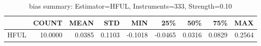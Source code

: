 \begin{table}[ht]
\centering
\caption{bias summary: Estimator=HFUL, Instruments=333, Strength=0.10}
\begin{tabular}{lrrrrrrrr}
\toprule
 & COUNT & MEAN & STD & MIN & 25\% & 50\% & 75\% & MAX \\
\midrule
HFUL & 10.0000 & 0.0385 & 0.1103 & -0.1018 & -0.0465 & 0.0316 & 0.0829 & 0.2564 \\
\bottomrule
\end{tabular}
\end{table}
